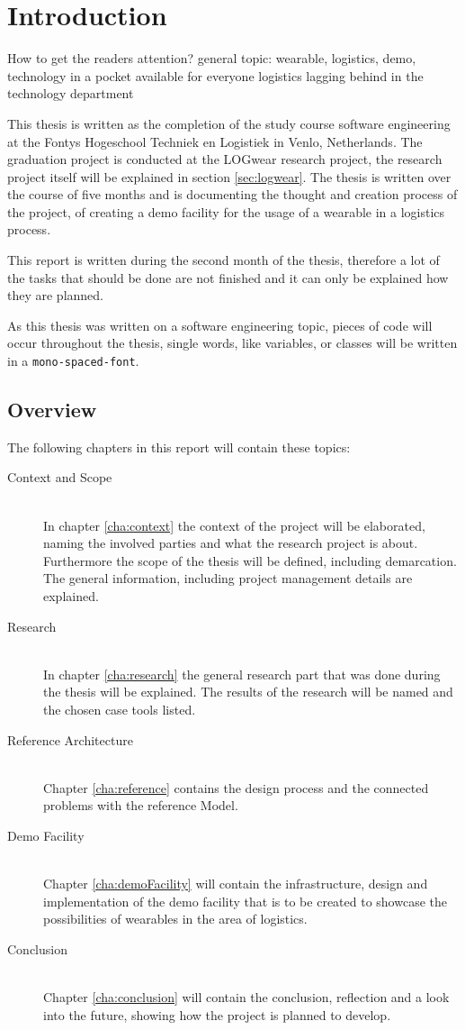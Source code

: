 \chapter{Introduction}
How to get the readers attention?
general topic:
wearable, logistics, demo, 
technology in a pocket available for everyone
logistics lagging behind in the technology department

This thesis is written as the completion of the study course software engineering at the Fontys Hogeschool Techniek en Logistiek in Venlo, Netherlands. The graduation project is conducted at the LOGwear research project, the research project itself will be explained in section \ref{sec:logwear}. The thesis is written over the course of five months and is documenting the thought and creation process of the project, of creating a demo facility for the usage of a wearable in a logistics process.

This report is written during the second month of the thesis, therefore a lot of the tasks that should be done are not finished and it can only be explained how they are planned.

As this thesis was written on a software engineering topic, pieces of code will occur throughout the thesis, single words, like variables, or classes will be written in a \texttt{mono-spaced-font}.
\section{Overview}
The following chapters in this report will contain these topics:

\begin{description}
	\item[Context and Scope] \hfill \\
	In chapter \ref{cha:context} the context of the project will be elaborated, naming the involved parties and what the research project is about. Furthermore the scope of the thesis will be defined, including demarcation. The general information, including project management details are explained.
	\item[Research] \hfill \\
	In chapter \ref{cha:research} the general research part that was done during the thesis will be explained. The results of the research will be named and the chosen \gls{case} tools listed.
	\item[Reference Architecture] \hfill \\
	Chapter \ref{cha:reference} contains the design process and the connected problems with the reference Model.
	\item[Demo Facility] \hfill \\
	Chapter \ref{cha:demoFacility} will contain the infrastructure, design and implementation of the demo facility that is to be created to showcase the possibilities of wearables in the area of logistics.
	\item[Conclusion] \hfill \\
	Chapter \ref{cha:conclusion} will contain the conclusion, reflection and a look into the future, showing how the project is planned to develop.
\end{description}